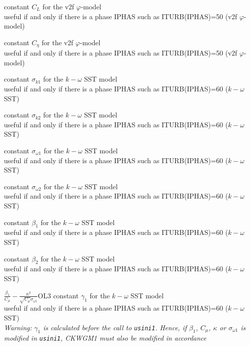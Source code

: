 {constant $C_L$ for the v2f $\varphi$-model\\
useful if and only if there is a phase IPHAS such as ITURB(IPHAS)=50
(v2f $\varphi$-model)}

{constant $C_\eta$ for the v2f $\varphi$-model\\
useful if and only if there is a phase IPHAS such as ITURB(IPHAS)=50
(v2f $\varphi$-model)}


{constant $\sigma_{k1}$ for the $k-\omega$ SST model\\
useful if and only if there is a phase IPHAS such as ITURB(IPHAS)=60
($k-\omega$ SST)}

{constant $\sigma_{k2}$ for the $k-\omega$ SST model\\
useful if and only if there is a phase IPHAS such as ITURB(IPHAS)=60
($k-\omega$ SST)}

{constant $\sigma_{\omega 1}$ for the $k-\omega$ SST model\\
useful if and only if there is a phase IPHAS such as ITURB(IPHAS)=60
($k-\omega$ SST)}

{constant $\sigma_{\omega 2}$ for the $k-\omega$ SST model\\
useful if and only if there is a phase IPHAS such as ITURB(IPHAS)=60
($k-\omega$ SST)}

{constant $\beta_1$ for the $k-\omega$ SST model\\
useful if and only if there is a phase IPHAS such as ITURB(IPHAS)=60
($k-\omega$ SST)}

{constant $\beta_2$ for the $k-\omega$ SST model\\
useful if and only if there is a phase IPHAS such as ITURB(IPHAS)=60
($k-\omega$ SST)}

{$\frac{\beta_1}{C_\mu}-\frac{\kappa^2}{\sqrt{C_\mu}\sigma_{\omega 1}}$}{O}{L3}
{constant $\gamma_1$ for the $k-\omega$ SST model\\
useful if and only if there is a phase IPHAS such as ITURB(IPHAS)=60
($k-\omega$ SST)\\
{\em Warning: $\gamma_1$ is calculated before the call to
\texttt{usini1}. Hence, if $\beta_1$, $C_\mu$, $\kappa$ or $\sigma_{\omega 1}$ 
is modified in \texttt{usini1}, CKWGM1 must also be modified in accordance}}

